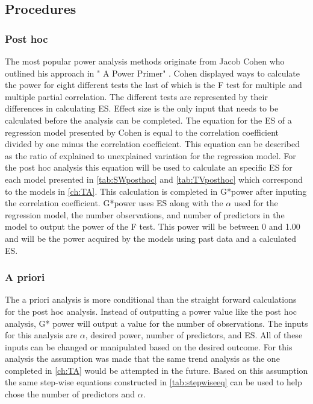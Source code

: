 \subsection{Procedures}
\subsubsection{Post hoc}

The most popular power analysis methods originate from Jacob Cohen who outlined his approach in " A Power Primer" \citep{cohen1992power}.
Cohen displayed ways to calculate the power for eight different tests the last of which is the F test for multiple and multiple partial correlation.
The different tests are represented by their differences in calculating ES.
Effect size is the only input that needs to be calculated before the analysis can be completed.
The equation for the ES of a regression model presented by Cohen is equal to the correlation coefficient divided by one minus the correlation coefficient.
This equation can be described as the ratio of explained to unexplained variation for the regression model.
For the post hoc analysis this equation will be used to calculate an specific ES for each model presented in \autoref{tab:SWposthoc} and \autoref{tab:TVposthoc} which correspond to the models in \autoref{ch:TA}.
This calculation is completed in G*power after inputing the correlation coefficient.
G*power uses ES along with the $\alpha$ used for the regression model, the number observations, and number of predictors in the model to output the power of the F test.
This power will be between 0 and 1.00 and will be the power acquired by the models using past data and a calculated ES.

\subsubsection{A priori}

The a priori analysis is more conditional than the straight forward calculations for the post hoc analysis.
Instead of outputting a power value like the post hoc analysis, G* power will output a value for the number of observations. 
The inputs for this analysis are $\alpha$, desired power, number of predictors, and ES.
All of these inputs can be changed or manipulated based on the desired outcome.
For this analysis the assumption was made that the same trend analysis as the one completed in \autoref{ch:TA} would be attempted in the future.
Based on this assumption the same step-wise equations constructed in \autoref{tab:stepwiseeq} can be used to help chose the number of predictors and $\alpha$.

